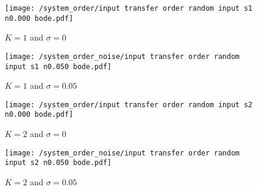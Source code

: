 \begin{example}
\begin{minipage}{1\textwidth}
       \medskip      
       \begin{subfigure}{0.495\textwidth}
           \centering
           \texttt{[image: /system\_order/input transfer order random input s1 n0.000 bode.pdf]}
           \caption{$K = 1$ and $\sigma = 0$}
           \label{subfigapp:tf_order_c}
       \end{subfigure}
       \hfill 
       \begin{subfigure}{0.495\textwidth}
           \centering
           \texttt{[image: /system\_order\_noise/input transfer order random input s1 n0.050 bode.pdf]}
           \caption{$K = 1$ and $\sigma = 0.05$}
           \label{subfigapp:tf_order_d}
       \end{subfigure}
       \hfill
       
       \medskip
       \begin{subfigure}{0.495\textwidth}
           \centering
           \texttt{[image: /system\_order/input transfer order random input s2 n0.000 bode.pdf]}
           \caption{$K = 2$ and $\sigma = 0$}
           \label{subfigapp:tf_order_e}
       \end{subfigure}
       \hfill
       \begin{subfigure}{0.495\textwidth}
           \centering
           \texttt{[image: /system\_order\_noise/input transfer order random input s2 n0.050 bode.pdf]}
           \caption{$K = 2$ and $\sigma = 0.05$}
           \label{subfigapp:tf_order_f}
       \end{subfigure}
       \hfill
       

\end{minipage}
\end{example}
